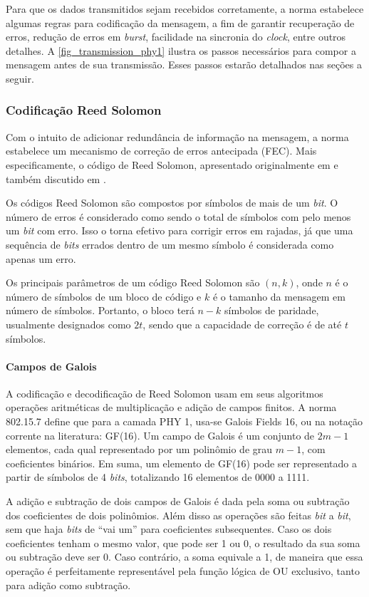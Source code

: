 	Para que os dados transmitidos sejam recebidos corretamente, a norma estabelece algumas regras para codificação da mensagem, a fim de garantir recuperação de erros, redução de erros em \emph{burst}, facilidade na sincronia do \textit{clock}, entre outros detalhes. A \autoref{fig_transmission_phy1} ilustra os passos necessários para compor a mensagem antes de sua transmissão. Esses passos estarão detalhados nas seções a seguir.


	\subsubsection{Codificação Reed Solomon}

	Com o intuito de adicionar redundância de informação na mensagem, a norma estabelece um mecanismo de correção de erros antecipada (FEC). Mais especificamente, o código de Reed Solomon, apresentado originalmente em \cite{reed-solomon-original} e também discutido em \cite{rs-bbc}.

	Os códigos Reed Solomon são compostos por símbolos de mais de um \textit{bit}. O número de erros é considerado como sendo o total de símbolos com pelo menos um \textit{bit} com erro. Isso o torna efetivo para corrigir erros em rajadas, já que uma sequência de \textit{bits} errados dentro de um mesmo símbolo é considerada como apenas um erro.

	Os principais parâmetros de um código Reed Solomon são $(n, k)$, onde $n$ é o número de símbolos de um bloco de código e $k$ é o tamanho da mensagem em número de símbolos. Portanto, o bloco terá $n - k$ símbolos de paridade, usualmente designados como $2t$, sendo que a capacidade de correção é de até $t$ símbolos.

	\paragraph{Campos de Galois}

	A codificação e decodificação de Reed Solomon usam em seus algoritmos operações aritméticas de multiplicação e adição de campos finitos. A norma 802.15.7 define que para a camada PHY 1, usa-se Galois Fields 16, ou na notação corrente na literatura: GF(16). Um campo de Galois é um conjunto de $2m - 1$ elementos, cada qual representado por um polinômio de grau $m - 1$, com coeficientes binários. Em suma, um elemento de GF(16) pode ser representado a partir de símbolos de 4 \textit{bits}, totalizando 16 elementos de 0000 a 1111.

	A adição e subtração de dois campos de Galois é dada pela soma ou subtração dos coeficientes de dois polinômios. Além disso as operações são feitas \textit{bit} a \textit{bit}, sem que haja \textit{bits} de ``vai um'' para coeficientes subsequentes. Caso os dois coeficientes tenham o mesmo valor, que pode ser 1 ou 0, o resultado da sua soma ou subtração deve ser 0. Caso contrário, a soma equivale a 1, de maneira que essa operação é perfeitamente representável pela função lógica de OU exclusivo, tanto para adição como subtração.

